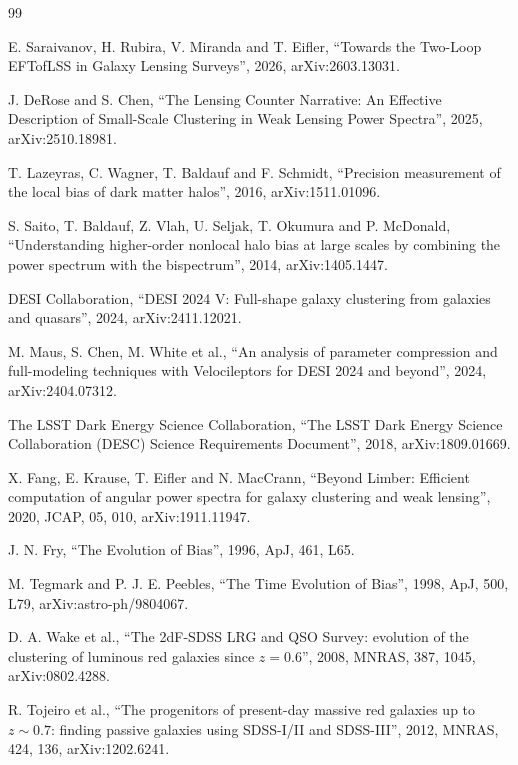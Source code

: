 \documentclass[11pt]{article}
\begin{document}
\begin{thebibliography}{99}

E. Saraivanov, H. Rubira, V. Miranda and T. Eifler,
``Towards the Two-Loop EFTofLSS in Galaxy Lensing Surveys'',
2026, arXiv:2603.13031.

J. DeRose and S. Chen,
``The Lensing Counter Narrative: An Effective Description of
Small-Scale Clustering in Weak Lensing Power Spectra'',
2025, arXiv:2510.18981.

T. Lazeyras, C. Wagner, T. Baldauf and F. Schmidt,
``Precision measurement of the local bias of dark matter halos'',
2016, arXiv:1511.01096.

S. Saito, T. Baldauf, Z. Vlah, U. Seljak, T. Okumura and P. McDonald,
``Understanding higher-order nonlocal halo bias at large scales by
combining the power spectrum with the bispectrum'',
2014, arXiv:1405.1447.

DESI Collaboration,
``DESI 2024 V: Full-shape galaxy clustering from galaxies and
quasars'',
2024, arXiv:2411.12021.

M. Maus, S. Chen, M. White et al.,
``An analysis of parameter compression and full-modeling techniques
with Velocileptors for DESI 2024 and beyond'',
2024, arXiv:2404.07312.

The LSST Dark Energy Science Collaboration,
``The LSST Dark Energy Science Collaboration (DESC) Science
Requirements Document'',
2018, arXiv:1809.01669.

X. Fang, E. Krause, T. Eifler and N. MacCrann,
``Beyond Limber: Efficient computation of angular power spectra for
galaxy clustering and weak lensing'',
2020, JCAP, 05, 010,
arXiv:1911.11947.

J. N. Fry,
``The Evolution of Bias'',
1996, ApJ, 461, L65.

M. Tegmark and P. J. E. Peebles,
``The Time Evolution of Bias'',
1998, ApJ, 500, L79,
arXiv:astro-ph/9804067.

D. A. Wake et al.,
``The 2dF-SDSS LRG and QSO Survey: evolution of the clustering of
luminous red galaxies since $z = 0.6$'',
2008, MNRAS, 387, 1045,
arXiv:0802.4288.

R. Tojeiro et al.,
``The progenitors of present-day massive red galaxies up to
$z \sim 0.7$: finding passive galaxies using SDSS-I/II and SDSS-III'',
2012, MNRAS, 424, 136,
arXiv:1202.6241.


\end{thebibliography}
\end{document}
